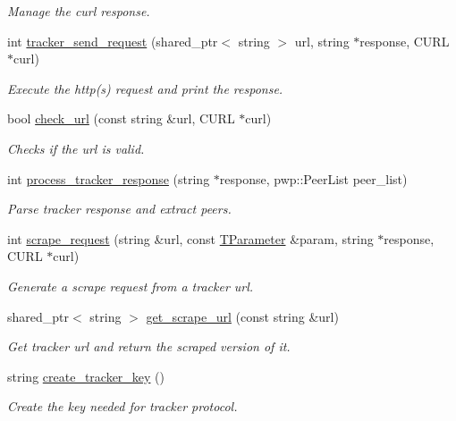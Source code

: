 \begin{DoxyCompactItemize}
\begin{DoxyCompactList}\small\item\em Manage the curl response. \end{DoxyCompactList}\item 
int \hyperlink{namespacetracker_a53773ba678237b3a3675d87a66c68aee}{tracker\+\_\+send\+\_\+request} (shared\+\_\+ptr$<$ string $>$ url, string $\ast$response, C\+U\+RL $\ast$curl)
\begin{DoxyCompactList}\small\item\em Execute the http(s) request and print the response. \end{DoxyCompactList}\item 
bool \hyperlink{namespacetracker_a2ceea8b68053534e15cb3ac3fd1702fb}{check\+\_\+url} (const string \&url, C\+U\+RL $\ast$curl)
\begin{DoxyCompactList}\small\item\em Checks if the url is valid. \end{DoxyCompactList}\item 
int \hyperlink{namespacetracker_ac31ad1c263b18cd7885f587823514abe}{process\+\_\+tracker\+\_\+response} (string $\ast$response, pwp\+::\+Peer\+List peer\+\_\+list)
\begin{DoxyCompactList}\small\item\em Parse tracker response and extract peers. \end{DoxyCompactList}\item 
int \hyperlink{namespacetracker_afd84715185a5e4a1351b77af43e7e01c}{scrape\+\_\+request} (string \&url, const \hyperlink{structtracker_1_1TParameter}{T\+Parameter} \&param, string $\ast$response, C\+U\+RL $\ast$curl)
\begin{DoxyCompactList}\small\item\em Generate a scrape request from a tracker url. \end{DoxyCompactList}\item 
shared\+\_\+ptr$<$ string $>$ \hyperlink{namespacetracker_ace1983d55d0f9efca5948d0a69d25ba6}{get\+\_\+scrape\+\_\+url} (const string \&url)
\begin{DoxyCompactList}\small\item\em Get tracker url and return the scraped version of it. \end{DoxyCompactList}\item 
string \hyperlink{namespacetracker_a722dfd0ec93e84bbbd448d2c9d6a9f1b}{create\+\_\+tracker\+\_\+key} ()
\begin{DoxyCompactList}\small\item\em Create the key needed for tracker protocol. \end{DoxyCompactList}\item 

\end{DoxyCompactItemize}
